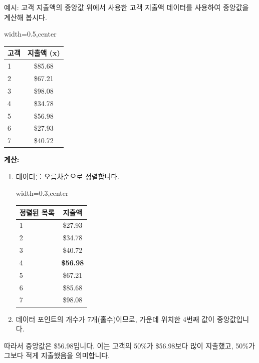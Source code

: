 \documentclass[11pt,a4paper]{article}
\begin{document}
\begin{examplebox}{예시: 고객 지출액의 중앙값}
위에서 사용한 고객 지출액 데이터를 사용하여 중앙값을 계산해 봅시다.

\begin{adjustbox}{width=0.5\textwidth,center}
\begin{tabular}{lc}
\toprule
\textbf{고객} & \textbf{지출액 (x)} \\
\midrule
1 & \$85.68 \\
2 & \$67.21 \\
3 & \$98.08 \\
4 & \$34.78 \\
5 & \$56.98 \\
6 & \$27.93 \\
7 & \$40.72 \\
\bottomrule
\end{tabular}
\end{adjustbox}
\label{tab:customer_spending_median}

\textbf{계산:}
\begin{enumerate}
    \item 데이터를 오름차순으로 정렬합니다.
    \begin{adjustbox}{width=0.3\textwidth,center}
    \begin{tabular}{lc}
    \toprule
    \textbf{정렬된 목록} & \textbf{지출액} \\
    \midrule
    1 & \$27.93 \\
    2 & \$34.78 \\
    3 & \$40.72 \\
    4 & \textbf{\$56.98} \\ %
    5 & \$67.21 \\
    6 & \$85.68 \\
    7 & \$98.08 \\
    \bottomrule
    \end{tabular}
    \end{adjustbox}
    \label{tab:customer_spending_ordered}
    \item 데이터 포인트의 개수가 7개(홀수)이므로, 가운데 위치한 4번째 값이 중앙값입니다.
\end{enumerate}
따라서 중앙값은 \$56.98입니다. 이는 고객의 50\%가 \$56.98보다 많이 지출했고, 50\%가 그보다 적게 지출했음을 의미합니다.
\end{examplebox}
\end{document}
